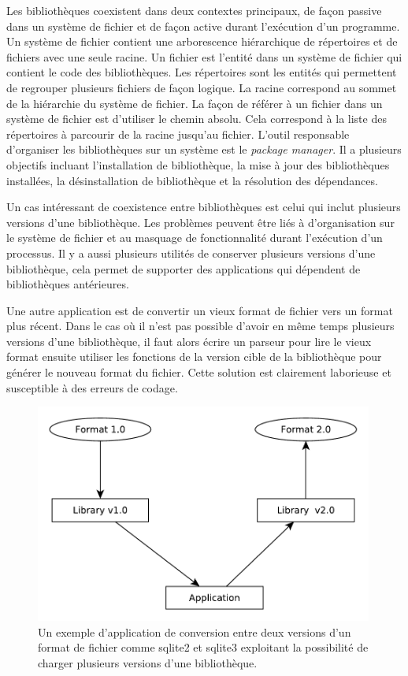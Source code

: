 Les bibliothèques coexistent dans deux contextes principaux, de façon passive
dans un système de fichier et de façon active durant l'exécution d'un
programme.  Un système de fichier contient une arborescence hiérarchique de
répertoires et de fichiers avec une seule racine. Un fichier est l'entité dans
un système de fichier qui contient le code des bibliothèques.  Les répertoires
sont les entités qui permettent de regrouper plusieurs fichiers de façon logique.
La racine correspond au sommet de la hiérarchie du système de fichier. La façon
de référer à un fichier dans un système de fichier est d'utiliser le chemin
absolu. Cela correspond à la liste des répertoires à parcourir de la racine
jusqu'au fichier. L'outil responsable d'organiser les bibliothèques sur un
système est le \textit{package manager}. Il a plusieurs objectifs incluant
l'installation de bibliothèque, la mise à jour des bibliothèques installées, la
désinstallation de bibliothèque et la résolution des dépendances.

Un cas intéressant de coexistence entre bibliothèques est celui qui inclut
plusieurs versions d'une bibliothèque. Les problèmes peuvent être liés à
d'organisation sur le système de fichier et au masquage de fonctionnalité
durant l'exécution d'un processus.  Il y a aussi plusieurs utilités de
conserver plusieurs versions d'une bibliothèque, cela permet de supporter des
applications qui dépendent de bibliothèques antérieures.

Une autre application est de convertir un vieux format de fichier vers un
format plus récent. Dans le cas où il n'est pas possible d'avoir en même temps
plusieurs versions d'une bibliothèque, il faut alors écrire un parseur pour
lire le vieux format ensuite utiliser les fonctions de la version cible de la
bibliothèque pour générer le nouveau format du fichier.  Cette solution est
clairement laborieuse et susceptible à des erreurs de codage.

\begin{figure}[ht]
  \includegraphics[width=30em]{figures/app_convert_v1_to_v2.pdf}
  \caption{Un exemple d'application de conversion entre deux versions d'un format
  de fichier comme sqlite2 et sqlite3 exploitant la possibilité de charger plusieurs
  versions d'une bibliothèque.}
\end{figure}

